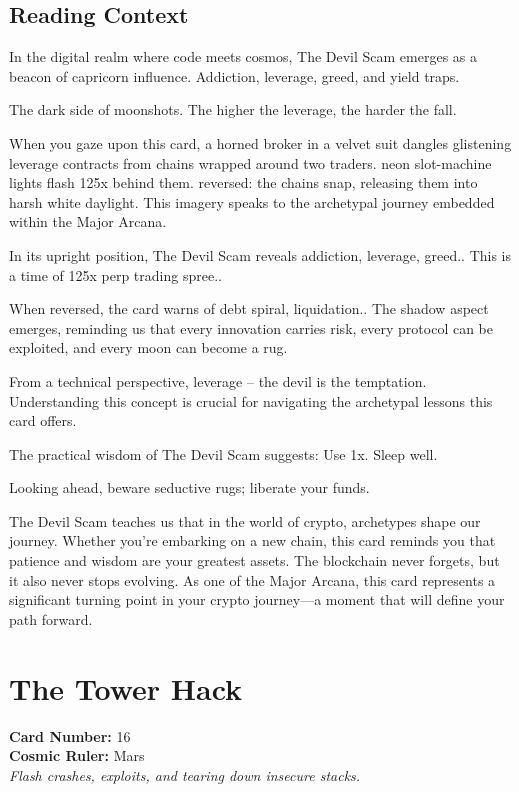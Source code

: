 \documentclass[11pt,oneside]{book}
\begin{document}
\begin{minipage}[t]{0.55\textwidth}
  \subsection*{Reading Context}
  In the digital realm where code meets cosmos, The Devil Scam emerges as a beacon of capricorn influence. Addiction, leverage, greed, and yield traps.

  The dark side of moonshots. The higher the leverage, the harder the fall.

  When you gaze upon this card, a horned broker in a velvet suit dangles glistening leverage contracts from chains wrapped around two traders. neon slot-machine lights flash 125x behind them. reversed: the chains snap, releasing them into harsh white daylight. This imagery speaks to the archetypal journey embedded within the Major Arcana.

  In its upright position, The Devil Scam reveals addiction, leverage, greed.. This is a time of 125x perp trading spree..

  When reversed, the card warns of debt spiral, liquidation.. The shadow aspect emerges, reminding us that every innovation carries risk, every protocol can be exploited, and every moon can become a rug.

  From a technical perspective, leverage – the devil is the temptation. Understanding this concept is crucial for navigating the archetypal lessons this card offers.

  The practical wisdom of The Devil Scam suggests: Use 1x. Sleep well.

  Looking ahead, beware seductive rugs; liberate your funds.

  The Devil Scam teaches us that in the world of crypto, archetypes shape our journey. Whether you're embarking on a new chain, this card reminds you that patience and wisdom are your greatest assets. The blockchain never forgets, but it also never stops evolving. As one of the Major Arcana, this card represents a significant turning point in your crypto journey—a moment that will define your path forward.

\end{minipage}

\newpage
\section*{The Tower Hack}

\begin{minipage}[t]{0.55\textwidth}
  \vspace{0pt}
  \textbf{Card Number:} 16\\  \textbf{Cosmic Ruler:} Mars\\  \textit{Flash crashes, exploits, and tearing down insecure stacks.}
\end{minipage}
\end{document}
